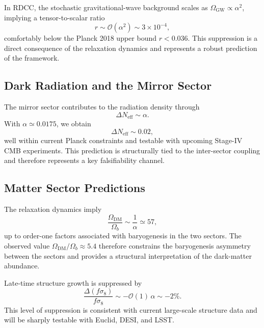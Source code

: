 \documentclass[11pt,a4paper]{article}
\begin{document}
In RDCC, the stochastic gravitational-wave background scales as
$\Omega_{\mathrm{GW}} \propto \alpha^2$, implying a tensor-to-scalar ratio
\begin{equation}
    r \sim \mathcal{O}(\alpha^2)
      \sim 3 \times 10^{-4},
\end{equation}
comfortably below the Planck 2018 upper bound $r < 0.036$. This suppression is a
direct consequence of the relaxation dynamics and represents a robust prediction
of the framework.

\subsection{Dark Radiation and the Mirror Sector}

The mirror sector contributes to the radiation density through
\begin{equation}
    \Delta N_{\mathrm{eff}} \sim \alpha.
\end{equation}
With $\alpha \simeq 0.0175$, we obtain
\begin{equation}
    \Delta N_{\mathrm{eff}} \sim 0.02,
\end{equation}
well within current Planck constraints and testable with upcoming Stage-IV CMB
experiments. This prediction is structurally tied to the inter-sector coupling
and therefore represents a key falsifiability channel.

\subsection{Matter Sector Predictions}

The relaxation dynamics imply
\begin{equation}
    \frac{\Omega_{\mathrm{DM}}}{\Omega_b} \sim \frac{1}{\alpha}
    \simeq 57,
\end{equation}
up to order-one factors associated with baryogenesis in the two sectors. The
observed value $\Omega_{\mathrm{DM}}/\Omega_b \approx 5.4$ therefore constrains
the baryogenesis asymmetry between the sectors and provides a structural
interpretation of the dark-matter abundance.

Late-time structure growth is suppressed by
\begin{equation}
    \frac{\Delta(f\sigma_8)}{f\sigma_8}
    \sim -\mathcal{O}(1)\,\alpha
    \sim -2\%.
\end{equation}
This level of suppression is consistent with current large-scale structure data
and will be sharply testable with Euclid, DESI, and LSST.
\end{document}
